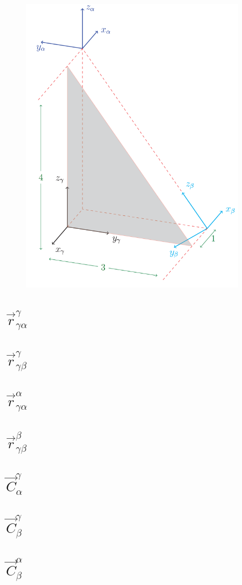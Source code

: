 \documentclass[12pt,letterpaper, onecolumn]{exam}
\begin{document}
\begin{questions}
{\begin{figure}[!h]
            \includegraphics[width=0.85\linewidth]{Q9.png}
        \end{figure}
        \clearpage
        \begin{parts}
            \part{$\vec{r}^{\gamma}_{\gamma\alpha}$}
            \part{$\vec{r}^{\gamma}_{\gamma\beta}$}
            \part{$\vec{r}^{\alpha}_{\gamma\alpha}$}
            \part{$\vec{r}^{\beta}_{\gamma\beta}$}
            \part{$\vec{C}^{\gamma}_{\alpha}$}
            \part{$\vec{C}^{\gamma}_{\beta}$}
            \part{$\vec{C}^{\alpha}_{\beta}$}
        \end{parts}
    }

\end{questions}
\end{document}
